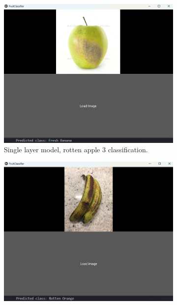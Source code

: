 \documentclass[conference]{IEEEtran}
\begin{document}
\begin{figure}[h]
\begin{subfigure}[b]{0.48\linewidth}
        \label{figFB}
    \end{subfigure}
    \hfill
    \begin{subfigure}[b]{0.48\linewidth}
        \centering
        \includegraphics[width=\linewidth]{1layer appelR3.png}
        \caption{Single layer model, rotten apple 3 classification.}
        \label{figFB}
    \end{subfigure}
    \hfill
    \begin{subfigure}[b]{0.48\linewidth}
        \centering
        \includegraphics[width=\linewidth]{1layer bananaR1.png}

\end{subfigure}
\end{figure}
\end{document}
